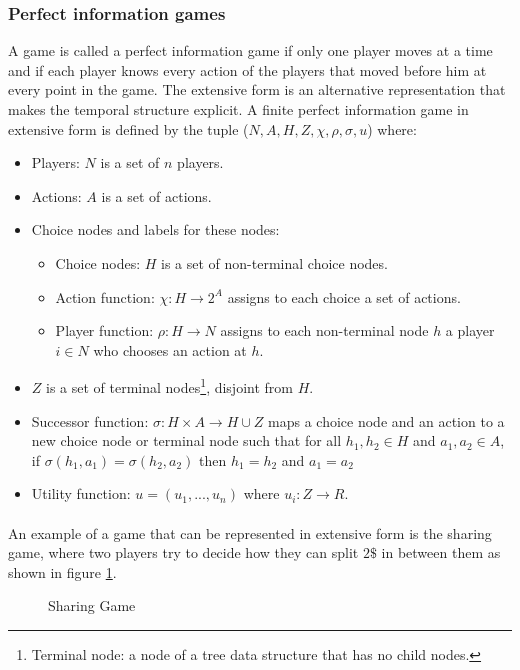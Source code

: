 \subsubsection{Perfect information games}
A game is called a perfect information game if only one player moves at a time and if each player knows every action of the players that moved before him at every point in the game.
The extensive form is an alternative representation that makes the temporal structure explicit. A finite perfect information game in extensive form is defined by the tuple ($N, A, H, Z,\chi ,\rho, \sigma, u $)
where:
\begin{itemize}
\item{Players: $N$ is a set of $n$ players.}
\item{Actions: $A$ is a set of actions.}
\item{Choice nodes and labels for these nodes: }
\begin{itemize}
\item{Choice nodes: $H$ is a set of non-terminal choice nodes.}
\item{Action function: $\chi : H \to 2^A $ assigns to each choice a set of actions.}
\item{Player function: $\rho : H \to N$ assigns to each non-terminal node $h$ a player $i \in N$ who chooses an action at $h$.}
\end{itemize}
\item{$Z$ is a set of terminal nodes\footnote{Terminal node: a node of a tree data structure that has no child nodes.}, disjoint from $H$.}
\item{Successor function: $\sigma : H \times A \to H \cup Z$ maps a choice node and an action to a new choice node or terminal node such that for all $h_1, h_2 \in H$ and $a_1, a_2 \in A$, if $\sigma(h_1, a_1) = \sigma(h_2, a_2)$ then $h_1  = h_2$  and $a_1 = a_2$} 
\item{Utility function: $u = (u_1,...,u_n)$ where $u_i : Z \to R$.
}
\end{itemize} 
\paragraph{}An example of a game that can be represented in extensive form is the sharing game, where two players try to decide how they can split $2\$$ in between them as shown in figure \ref{fig:sf}.
\begin{figure}[h!]
 
  \centering
  \caption{Sharing Game\label{fig:sf}}
\end{figure}
